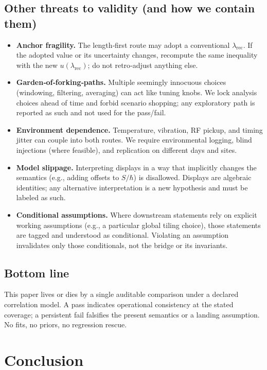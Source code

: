 \documentclass[11pt]{article}
\begin{document}
\subsection*{Other threats to validity (and how we contain them)}
\begin{itemize}
  \item \textbf{Anchor fragility.} The length‑first route may adopt a conventional \(\lambda_{\mathrm{rec}}\). If the adopted value or its uncertainty changes, recompute the same inequality with the new \(u(\lambda_{\mathrm{rec}})\); do not retro‑adjust anything else.
  \item \textbf{Garden‑of‑forking‑paths.} Multiple seemingly innocuous choices (windowing, filtering, averaging) can act like tuning knobs. We lock analysis choices ahead of time and forbid scenario shopping; any exploratory path is reported as such and not used for the pass/fail.
  \item \textbf{Environment dependence.} Temperature, vibration, RF pickup, and timing jitter can couple into both routes. We require environmental logging, blind injections (where feasible), and replication on different days and sites.
  \item \textbf{Model slippage.} Interpreting displays in a way that implicitly changes the semantics (e.g., adding offsets to \(S/\hbar\)) is disallowed. Displays are algebraic identities; any alternative interpretation is a new hypothesis and must be labeled as such.
  \item \textbf{Conditional assumptions.} Where downstream statements rely on explicit working assumptions (e.g., a particular global tiling choice), those statements are tagged and understood as conditional. Violating an assumption invalidates only those conditionals, not the bridge or its invariants.
\end{itemize}

\subsection*{Bottom line}
This paper lives or dies by a single auditable comparison under a declared correlation model. A pass indicates operational consistency at the stated coverage; a persistent fail falsifies the present semantics or a landing assumption. No fits, no priors, no regression rescue.

\section{Conclusion}
\end{document}
